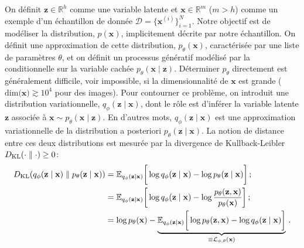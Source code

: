 On définit $\mathbf{z}\in \mathbb{R}^{h}$ comme une variable latente et $\mathbf{x}\in \mathbb{R}^{m}$ ($m > h$) 
comme un exemple d'un échantillon de donnée $\mathcal{D} = \{\mathbf{x}^{(i)}\}_{i=1}^{N}$. 
Notre objectif est de modéliser la distribution, $p(\mathbf{x})$, implicitement décrite par notre échantillon. 
On définit une approximation de cette distribution, $p_\theta(\mathbf{x})$, caractérisée par une liste de paramètres $\theta$,
et on définit un processus génératif modélisé par la conditionnelle sur la variable cachée $p_\theta(\mathbf{x \mid \mathbf{z}})$. 
Déterminer $p_\theta$ directement est généralement difficile, voir impossible, si la dimensionnalité de $\mathbf{x}$ est grande 
($\mathrm{dim(\mathbf{x}}) \gtrsim 10^{4}$ pour des images). 
Pour contourner ce problème, on introduit une distribution variationnelle, $q_\phi(\mathbf{z} \mid \mathbf{x})$, dont le rôle est 
d'inférer la variable latente $\mathbf{z}$ associée à $\mathbf{x} \sim p_\theta(\mathbf{x} \mid \mathbf{z})$. 
En d'autres mots, $q_\phi(\mathbf{z} \mid \mathbf{x})$ est une approximation variationnelle de la distribution a posteriori $p_\theta(\mathbf{z} \mid \mathbf{x})$.
La notion de distance entre ces deux distributions est mesurée par la divergence de Kullback-Leibler $D_{\mathrm{KL}}(\cdot \mathrel{\Vert} \cdot) \geq 0$: 
\begin{align}
        \nonumber
       D_{\mathrm{KL}}(q_\phi(\mathbf{z} \mid \mathbf{x}) \mathrel{\Vert}  p_\theta (\mathbf{z} \mid \mathbf{x})) 
       &= \mathbb{E}_{q_\phi(\mathbf{z} \mid \mathbf{x})} \bigg[\log q_\phi(\mathbf{z} \mid \mathbf{x}) - \log p_\theta (\mathbf{z} \mid \mathbf{x}) \bigg]\, ;  \\
       \nonumber
       &= \mathbb{E}_{q_\phi(\mathbf{z} \mid \mathbf{x})} \bigg[\log q_\phi (\mathbf{z} \mid \mathbf{x}) -\log \frac{p_\theta(\mathbf{z}, \mathbf{x})}{p_\theta(\mathbf{x})} \bigg]\, ;  \\
       \label{eq:KL}
       &= \log p_\theta (\mathbf{x}) - \underbrace{\mathbb{E}_{q_\phi(\mathbf{z} \mid \mathbf{x})} \bigg[\log p_\theta(\mathbf{z}, \mathbf{x}) - \log q_\phi (\mathbf{z} \mid \mathbf{x}) \bigg]}_{\equiv \mathcal{L}_{\phi,\theta}(\mathbf{x})} \, .
\end{align} 


